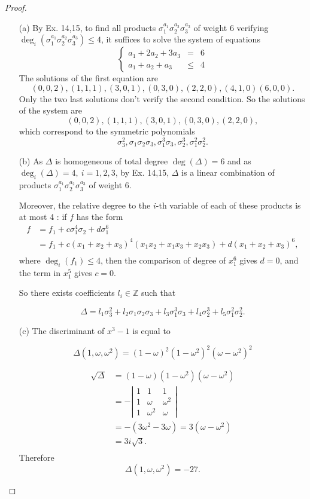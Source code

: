 \documentclass[11pt,a4paper]{article}
\newcommand{\Z}{\mathbb{Z}}
\begin{document}
\begin{proof}
\begin{enumerate}
\item[(a)]
By Ex. 14,15, to find all products $\sigma_1^{a_1} \sigma_2^{a_2} \sigma_3^{a_3}$ of weight 6 verifying $\deg_i(\sigma_1^{a_1} \sigma_2^{a_2} \sigma_3^{a_3}) \leq 4$, it suffices to solve the system of equations
$$
\left\{
\begin{array}{ccc}
a_1+2a_2+3a_3  & =  &  6 \\
 a_1+a_2+a_3 &\leq &   4   
\end{array}
\right.
$$
The solutions of the first equation are
$$(0,0,2),  (1,1,1), (3,0,1),(0,3,0) , (2,2,0), (4,1,0) (6,0,0).$$
Only the two last solutions don't verify the second condition. So the solutions of the system are
$$(0,0,2), (1,1,1), (3,0,1),(0,3,0) , (2,2,0),$$
which correspond to the symmetric polynomials
$$\sigma_3^2,  \sigma_1\sigma_2\sigma_3, \sigma_1^3 \sigma_3, \sigma_2^3, \sigma_1^2 \sigma_2^2.$$


\item[(b)]
As $\Delta$ is homogeneous of total degree $\deg(\Delta) = 6 $ and  as $\deg_i(\Delta) = 4, \ i=1,2,3$, by Ex. 14,15, $\Delta$ is a linear combination of  products $\sigma_1^{a_1} \sigma_2^{a_2} \sigma_3^{a_3}$ of weight 6. 

Moreover, the relative degree to the $i$-th variable of each of these products is at most 4 : if $f$ has the form
\begin{align*}
f &= f_1 + c \sigma_1^4 \sigma_2 + d \sigma_1^6\\
&= f_1+ c(x_1+x_2+x_3)^4(x_1x_2+x_1x_3+x_2x_3) + d (x_1+x_2+x_3)^6,\\
\end{align*}
where $\deg_i(f_1) \leq 4$, then the comparison of degree of  $x_1^6$ gives $d=0$, and the term in  $x_1^5$ gives $c=0$.

So there exists coefficients $l_i \in \Z$ such that 

$$\Delta = l_1\sigma_3^2+l_2\sigma_1\sigma_2\sigma_3+l_3\sigma_1^3\sigma_3+ l_4\sigma_2^3+l_5\sigma_1^2\sigma_2^2.$$


\item[(c)]
The discriminant of $x^3-1$ is equal to

$$\Delta(1,\omega,\omega^2) = (1-\omega)^2(1-\omega^2)^2(\omega-\omega^2)^2$$

\begin{align*}
\sqrt{\Delta} &= (1-\omega)(1-\omega^2)(\omega - \omega^2)\\
&= - 
\left \vert
\begin{array}{ccc}
 1&   1 & 1 \\
 1&   \omega  & \omega^2\\
1&   \omega^2  & \omega
\end{array}
\right \vert\\
&= -(3\omega^2 - 3 \omega) = 3(\omega-\omega^2)\\
&= 3i\sqrt{3}.\\
\end{align*}
Therefore $$\Delta(1,\omega,\omega^2) = -27.$$


\end{enumerate}
\end{proof}
\end{document}
